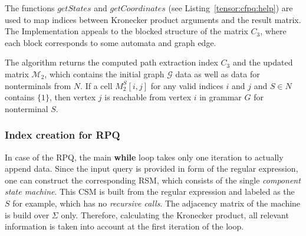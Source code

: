 The functions $getStates$ and $getCoordinates$ (see Listing~\ref{tensor:cfpq:help})
are used to map indices between Kronecker product arguments and the result matrix.
The Implementation appeals to the blocked structure of the matrix $C_3$, 
where each block corresponds to some automata and graph edge.

The algorithm returns the computed path extraction index $C_3$ and 
the updated matrix $\mathcal{M}_2$, which contains the initial 
graph $\mathcal{G}$ data as well as data for nonterminals from $N$.
If a cell $M_2^S[i,j]$ for any valid indices $i$ and $j$ and $S \in N$ 
contains $\{1\}$, then vertex $j$ is reachable from vertex $i$ in grammar $G$ for 
nonterminal $S$.

\subsubsection{Index creation for RPQ}
In case of the RPQ, the main \textbf{while} loop takes only one iteration to actually
append data. Since the input query is provided in form of the regular expression, one
can construct the corresponding RSM, which consists of the single 
\textit{component state machine}. This CSM is built from the regular expression and labeled as 
the $S$ for example, which has no \textit{recursive calls}. The adjacency 
matrix of the machine is build over $\Sigma$ only. Therefore, calculating the 
Kronecker product, all relevant information is taken into account at the first 
iteration of the loop.

